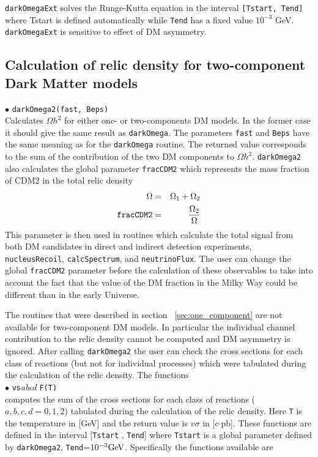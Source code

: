 \documentclass[12pt,a4paper]{article}
\begin{document}
 {\tt darkOmegaExt} solves  the Runge-Kutta equation in the interval {\tt [Tstart, Tend]} 
 where Tstart is defined automatically while {\tt Tend} has a fixed
value $10^{-3}$ GeV.  {\tt darkOmegaExt} is sensitive to effect of DM
asymmetry.
 

\subsection{Calculation of relic density for  two-component Dark Matter models}


$\bullet$ \verb|darkOmega2(fast, Beps)|\\
Calculates $\Omega h^2$ for either  one- or  two-components DM models. In the former case it should give the same result as \verb|darkOmega|.
The parameters {\tt fast} and {\tt Beps} have the same meaning as for the {\tt darkOmega} routine.
The returned value corresponds to the sum of the contribution of the two  DM components to  $\Omega h^2$.  
 \verb|darkOmega2| also calculates the  global parameter {\tt fracCDM2} which represents the mass fraction of CDM2 
in the total relic density
\begin{eqnarray}
  \Omega &=& \Omega_1+\Omega_2\\
  \verb|fracCDM2|&=&\frac{\Omega_2}{\Omega}
\end{eqnarray}
This parameter is then used in routines which calculate the total signal from both  DM candidates in direct and indirect detection experiments,
 \verb|nucleusRecoil|, \verb|calcSpectrum|,  and \verb|neutrinoFlux|.  The user can change the global {\tt  fracCDM2} parameter before the calculation of these observables
to take into account the fact that the value of the DM fraction in the Milky Way could be different than   in the early Universe.

The routines that were described in section ~\ref{sec:one_component} are not available for two-component DM models. In particular the individual channel contribution to the relic density cannot be computed and DM asymmetry is ignored. 
 After calling  {\tt  darkOmega2}  the user can check the  cross sections  
for each class of reactions (but not for individual processes) which were tabulated during the calculation of the relic density. 
The functions\\
$\bullet$ \verb|vs|{\it abcd} \verb|F(T)|\\
computes the sum of  the cross sections  
for each class of reactions ($a,b,c,d=0,1,2$) tabulated during the calculation of the relic density. 
Here  \verb|T| is the temperature in [GeV] and the 
return value is $v\sigma$ in [c$\cdot$pb].  These functions are defined in the interval [{\tt Tstart} , {\tt Tend}] where
{\tt Tstart} is a global parameter defined by \verb|darkOmega2|, {\tt Tend}=$10^{-3}{\rm GeV}$. Specifically the functions available are
\end{document}
